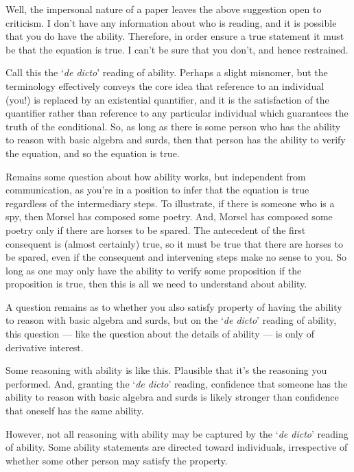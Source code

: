 \begin{note}[Difficulty]
  Well, the impersonal nature of a paper leaves the above suggestion open to criticism.
  I don't have any information about who is reading, and it is possible that you do have the ability.
  Therefore, in order ensure a true statement it must be that the equation is true.
  I can't be sure that you don't, and hence restrained.

  Call this the `\emph{de dicto}' reading of ability.
  Perhaps a slight misnomer, but the terminology effectively conveys the core idea that reference to an individual (you!) is replaced by an existential quantifier, and it is the satisfaction of the quantifier rather than reference to any particular individual which guarantees the truth of the conditional.
  So, as long as there is some person who has the ability to reason with basic algebra and surds, then that person has the ability to verify the equation, and so the equation is true.

  Remains some question about how ability works, but independent from communication, as you're in a position to infer that the equation is true regardless of the intermediary steps.
  To illustrate, if there is someone who is a spy, then Morsel has composed some poetry.
  And, Morsel has composed some poetry only if there are horses to be spared.
  The antecedent of the first consequent is (almost certainly) true, so it must be true that there are horses to be spared, even if the consequent and intervening steps make no sense to you.
  So long as one may only have the ability to verify some proposition if the proposition is true, then this is all we need to understand about ability.

  A question remains as to whether you also satisfy property of having the ability to reason with basic algebra and surds, but on the `\emph{de dicto}' reading of ability, this question --- like the question about the details of ability --- is only of derivative interest.

  Some reasoning with ability is like this.
  Plausible that it's the reasoning you performed.
  And, granting the `\emph{de dicto}' reading, confidence that someone has the ability to reason with basic algebra and surds is likely stronger than confidence that oneself has the same ability.

  However, not all reasoning with ability may be captured by the `\emph{de dicto}' reading of ability.
  Some ability statements are directed toward individuals, irrespective of whether some other person may satisfy the property.
\end{note}


